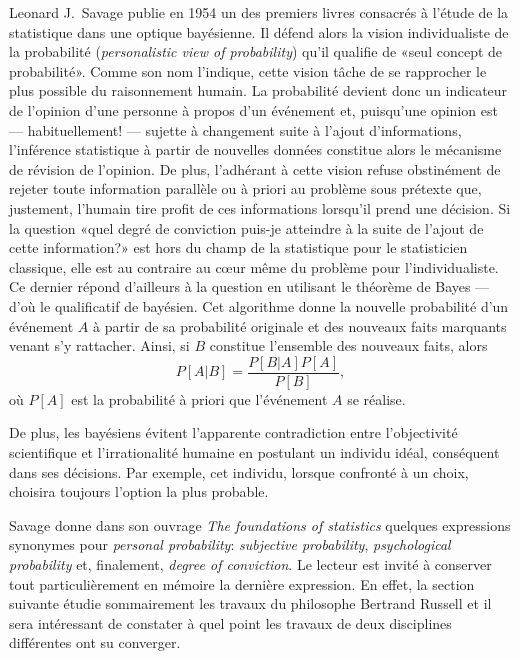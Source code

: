 Leonard J.\ Savage publie en 1954 \citep{Savage:foundations:1954} un des premiers
livres consacrés à l'étude de la statistique dans une optique
bayésienne. Il défend alors la vision individualiste de la probabilité
(\emph{personalistic view of probability}) qu'il qualifie de «seul
concept de probabilité». Comme son nom l'indique, cette vision tâche
de se rapprocher le plus possible du raisonnement humain.  La
probabilité devient donc un indicateur de l'opinion d'une personne à
propos d'un événement et, puisqu'une opinion est --- habituellement!
--- sujette à changement suite à l'ajout d'informations, l'inférence
statistique à partir de nouvelles données constitue alors le mécanisme
de révision de l'opinion. De plus, l'adhérant à cette vision refuse
obstinément de rejeter toute information parallèle ou à priori au
problème sous prétexte que, justement, l'humain tire profit de ces
informations lorsqu'il prend une décision. Si la question «quel degré
de conviction puis-je atteindre à la suite de l'ajout de cette information?»
est hors du champ de la statistique pour le statisticien classique,
elle est au contraire au c{\oe}ur même du problème pour
l'individualiste.  Ce dernier répond d'ailleurs à la question en
utilisant le théorème de Bayes --- d'où le qualificatif de bayésien.
Cet algorithme donne la nouvelle probabilité d'un événement $A$ à
partir de sa probabilité originale et des nouveaux faits marquants
venant s'y rattacher. Ainsi, si $B$ constitue l'ensemble des nouveaux
faits, alors
\begin{equation*}
  P[A|B]= \frac{P[B|A]P[A]}{P[B]},
\end{equation*}
où $P[A]$ est la probabilité à priori que l'événement $A$ se réalise.

De plus, les bayésiens évitent l'apparente contradiction entre
l'objectivité scientifique et l'irrationalité humaine en postulant un
individu idéal, conséquent dans ses décisions. Par exemple, cet
individu, lorsque confronté à un choix, choisira toujours l'option la
plus probable.

Savage donne dans son ouvrage \emph{The foundations of statistics}
quelques expressions synonymes pour \emph{personal probability}:
\emph{subjective probability}, \emph{psychological probability} et,
finalement, \emph{degree of conviction}. Le lecteur est invité à
conserver tout particulièrement en mémoire la dernière expression. En
effet, la section suivante étudie sommairement les travaux du
philosophe Bertrand Russell et il sera intéressant de constater à quel
point les travaux de deux disciplines différentes ont su converger.

